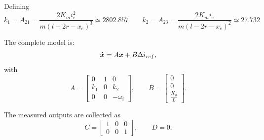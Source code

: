Defining
\[
    k_1 = A_{21} = \frac{2 K_m i_e^2}{m (l - 2 r - x_e)^3} \simeq 2802.857
    \qquad
    k_2 = A_{23} = \frac{2 K_m i_e}{m (l - 2 r - x_e)^2} \simeq 27.732
\]

The complete model is:
\begin{equation}
    \dot{\boldsymbol{x}} = A \boldsymbol{x} + B \Delta i_{ref},
\end{equation}
with
\begin{equation}
    A =
    \begin{bmatrix}
        0 & 1 & 0 \\
        k_1 & 0 & k_2 \\
        0 & 0 & -\omega_i
    \end{bmatrix},
    \qquad
    B =
    \begin{bmatrix}
        0 \\
        0 \\
        \frac{K_g}{L}
    \end{bmatrix}.
\end{equation}

The measured outputs are collected as
\begin{equation}
    C =
    \begin{bmatrix}
        1 & 0 & 0 \\
        0 & 0 & 1
    \end{bmatrix},
    \qquad
    D = 0.
\end{equation}
